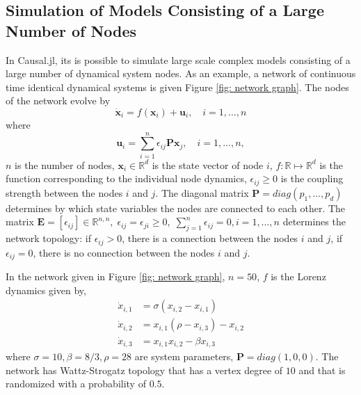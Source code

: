 \subsection{Simulation of Models Consisting of a Large Number of Nodes}
In Causal.jl, its is possible to simulate large scale complex models consisting of a large number of dynamical system nodes. As an example, a network of continuous time identical dynamical systems is given Figure \ref{fig: network graph}. The nodes of the network evolve by 
\begin{equation}
    \dot{\bm{x}}_i = f(\bm{x}_i) + \bm{u}_i, \quad i = 1, \ldots, n
    \label{eq: network equation}
\end{equation}
where 
\begin{equation}
    \bm{u}_i = \sum_{i = 1}^n \epsilon_{ij} \bm{P} \bm{x}_j, \quad i = 1, \ldots, n,
    \label{eq: network node inputs}
\end{equation}
$n$ is the number of nodes, $\bm{x}_i \in \mathbb{R}^d$ is the state vector of node $i$, $f: \mathbb{R} \mapsto \mathbb{R}^d$ is the function corresponding to the individual node dynamics, $\epsilon_{ij} \geq 0 $ is the coupling strength between the nodes $i$ and $j$. The diagonal matrix $\bm{P} = diag(p_1, \ldots, p_d)$ determines by which state variables the nodes are connected to each other. The matrix $\bm{E} = [\epsilon_{ij}] \in \mathbb{R}^{n, n}, \; \epsilon_{ij} = \epsilon_{ji} \geq 0, \; \sum_{j = 1}^n \epsilon_{ij} = 0, i = 1, \ldots, n$ determines the network topology: if $\epsilon_{ij} > 0$, there is a connection between the nodes $i$ and $j$, if $\epsilon_{ij} = 0$, there is no connection between the nodes $i$ and $j$.

In the network given in Figure \ref{fig: network graph}, $n=50$,  $f$ is the Lorenz dynamics given by,
\begin{equation}
    \begin{split}
        \dot{x}_{i,1} &= \sigma (x_{i, 2} - x_{i, 1}) \\
        \dot{x}_{i,2} &= x_{i, 1} (\rho -  x_{i, 3}) - x_{i, 2} \\
        \dot{x}_{i,3} &= x_{i, 1} x_{i, 2} - \beta x_{i, 3}
    \end{split}
\end{equation}
where $\sigma=10, \beta=8/3, \rho=28$ are system parameters, $\bm{P} = diag(1, 0, 0)$. The network has Wattz-Strogatz topology that has a vertex degree of $10$ and that is randomized with a probability of $0.5$\cite{watts1998collective}.

